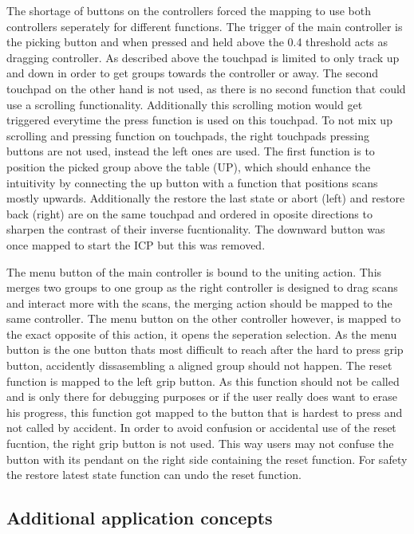 \documentclass[hyperref,english,bachelorofscience,bibnum]{cgvpub}
\begin{document}
The shortage of buttons on the controllers forced the mapping to use both controllers seperately for different functions. The trigger of the main controller is the picking button and when pressed and held above the 0.4 threshold acts as dragging controller. As described above the touchpad is limited to only track up and down in order to get groups towards the controller or away. The second touchpad on the other hand is not used, as there is no second function that could use a scrolling functionality. Additionally this scrolling motion would get triggered everytime the press function is used on this touchpad. To not mix up scrolling and pressing function on touchpads, the right touchpads pressing buttons are not used, instead the left ones are used. The first function is to position the picked group above the table (UP), which should enhance the intuitivity by connecting the up button with a function that positions scans mostly upwards. Additionally the restore the last state or abort (left) and restore back (right) are on the same touchpad and ordered in oposite directions to sharpen the contrast of their inverse fucntionality. The downward button was once mapped to start the ICP but this was removed.

The menu button of the main controller is bound to the uniting action. This merges two groups to one group as the right controller is designed to drag scans and interact more with the scans, the merging action should be mapped to the same controller.
The menu button on the other controller however, is mapped to the exact opposite of this action, it opens the seperation selection. As the menu button is the one button thats most difficult to reach after the hard to press grip button, accidently dissasembling a aligned group should not happen.
The reset function is mapped to the left grip button. As this function should not be called and is only there for debugging purposes or if the user really does want to erase his progress, this function got mapped to the button that is hardest to press and not called by accident.
In order to avoid confusion or accidental use of the reset fucntion, the right grip button is not used. This way users may not confuse the button with its pendant on the right side containing the reset function. For safety the restore latest state function can undo the reset function.

\subsection{Additional application concepts}
\end{document}
